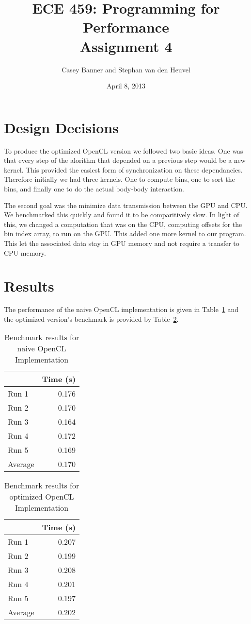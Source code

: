\documentclass[12pt]{article}
\title{ECE 459: Programming for Performance\\Assignment 4}
\author{Casey Banner and Stephan van den Heuvel}
\date{April 8, 2013}
\begin{document}
\maketitle

\section{Design Decisions}
To produce the optimized OpenCL version we followed two basic ideas. One was that every step of the alorithm
that depended on a previous step would be a new kernel. This provided the easiest form of synchronization on
these dependancies. Therefore initially we had three kernels. One to compute bins, one to sort the bins, and 
finally one to do the actual body-body interaction.

The second goal was the minimize data transmission between the GPU and CPU. We benchmarked this quickly and
found it to be comparitively slow. In light of this, we changed a computation that was on the CPU, computing
offsets for the bin index array, to run on the GPU. This added one more kernel to our program. This let the associated data stay in GPU memory and not require a transfer to CPU memory.

\section{Results}

The performance of the naive OpenCL implementation is given in Table~\ref{tbl-naive-bench} and the optimized 
version's benchmark is provided by Table~\ref{tbl-opt-bench}.

\begin{table}[H]
  \centering
  \begin{tabular}{lr}
    & {\bf Time (s)} \\
    \hline
    Run 1 & 0.176 \\
    Run 2 & 0.170 \\
    Run 3 & 0.164 \\
    Run 4 & 0.172 \\
    Run 5 & 0.169 \\
    \hline
    Average & 0.170 \\
  \end{tabular}
  \caption{Benchmark results for naive OpenCL Implementation}
  \label{tbl-naive-bench}
\end{table}

\begin{table}[H]
  \centering
  \begin{tabular}{lr}
    & {\bf Time (s)} \\
    \hline
    Run 1 & 0.207 \\
    Run 2 & 0.199 \\
    Run 3 & 0.208 \\
    Run 4 & 0.201 \\
    Run 5 & 0.197 \\
    \hline
    Average & 0.202 \\
  \end{tabular}
  \caption{Benchmark results for optimized OpenCL Implementation}
  \label{tbl-opt-bench}
\end{table}
\end{document}
